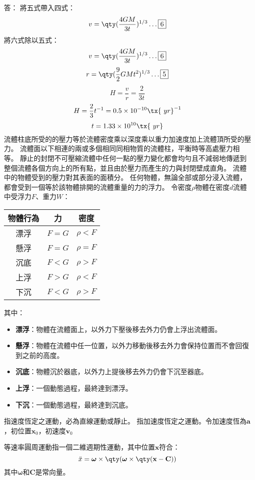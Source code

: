 \documentclass[a4paper,12pt]{article}
\begin{document}
答： 將五式帶入四式：
\[v=\qty(\frac{4GM}{3t})^{1/3}\ldots\boxed{6}\]
將六式除以五式：
\[v=\qty(\frac{4GM}{3t})^{1/3}\ldots\boxed{6}\]
\[r=\qty(\frac{9}{2}GMt^2)^{1/3}\ldots\boxed{5}\]
\[H=\frac{v}{r}=\frac{2}{3t}\]
\[H=\frac{2}{3}t^{-1}=0.5\times 10^{-10}\tx{\ yr}^{-1}\]
\[t=1.33\times 10^{10}\tx{\ yr}\]
流體柱底所受的的壓力等於流體密度乘以深度乘以重力加速度加上流體頂所受的壓力。
流體面以下相連的兩或多個相同同相物質的流體柱，平衡時等高處壓力相等。
靜止的封閉不可壓縮流體中任何一點的壓力變化都會均勻且不減弱地傳遞到整個流體各個方向上的所有點，並且由於壓力而產生的力與封閉壁成直角。
流體中的物體受到的壓力對其表面的面積分。
任何物體，無論全部或部分浸入流體，都會受到一個等於該物體排開的流體重量的力的浮力。
令密度$\rho$物體在密度$d$流體中受浮力$F$、重力$W$：
\begin{longtable}[c]{|c|c|c|}
\hline
物體行為 & 力 & 密度 \\\hline\endhead
漂浮 & $F=G$ & $\rho<F$ \\\hline
懸浮 & $F=G$ & $\rho=F$ \\\hline
沉底 & $F<G$ & $\rho>F$ \\\hline
上浮 & $F>G$ & $\rho<F$ \\\hline
下沉 & $F<G$ & $\rho>F$ \\\hline
\end{longtable}\FB
其中：
\begin{itemize}
\item\textbf{漂浮}：物體在流體面上，以外力下壓後移去外力仍會上浮出流體面。
\item\textbf{懸浮}：物體在流體中任一位置，以外力移動後移去外力會保持位置而不會回復到之前的高度。
\item\textbf{沉底}：物體沉於器底，以外力上提後移去外力仍會下沉至器底。
\item\textbf{上浮}：一個動態過程，最終達到漂浮。
\item\textbf{下沉}：一個動態過程，最終達到沉底。
\end{itemize}
指速度恆定之運動，必為直線運動或靜止。
指加速度恆定之運動。令加速度恆為$\mathbf{a}$，初位置$\mathbf{x}_0$，初速度$\mathbf{v}_0$

等速率圓周運動指一個二維週期性運動，其中位置$\mathbf{x}$符合：
\[\ddot{x}=\boldsymbol{\omega}\times\qty(\boldsymbol{\omega}\times\qty(\mathbf{x}-\mathbf{C}))\]
其中$\boldsymbol{\omega}$和$\mathbf{C}$是常向量。
\end{document}
